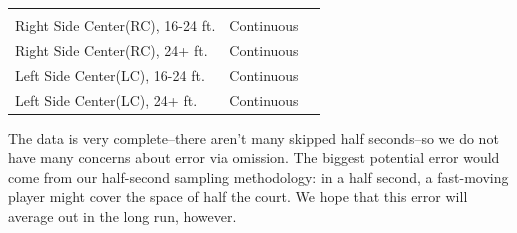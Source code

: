 \documentclass[]{article}
\begin{document}
\begin{longtable}[]{@{}lll@{}}
\begin{minipage}[t]{0.46\columnwidth}
\strut
\end{minipage}\tabularnewline
\begin{minipage}[t]{0.32\columnwidth}\raggedright\strut
Right Side Center(RC), 16-24 ft.\strut
\end{minipage} & \begin{minipage}[t]{0.13\columnwidth}\raggedright\strut
Continuous\strut
\end{minipage} & \begin{minipage}[t]{0.46\columnwidth}\raggedright\strut
\strut
\end{minipage}\tabularnewline
\begin{minipage}[t]{0.32\columnwidth}\raggedright\strut
Right Side Center(RC), 24+ ft.\strut
\end{minipage} & \begin{minipage}[t]{0.13\columnwidth}\raggedright\strut
Continuous\strut
\end{minipage} & \begin{minipage}[t]{0.46\columnwidth}\raggedright\strut
\strut
\end{minipage}\tabularnewline
\begin{minipage}[t]{0.32\columnwidth}\raggedright\strut
Left Side Center(LC), 16-24 ft.\strut
\end{minipage} & \begin{minipage}[t]{0.13\columnwidth}\raggedright\strut
Continuous\strut
\end{minipage} & \begin{minipage}[t]{0.46\columnwidth}\raggedright\strut
\strut
\end{minipage}\tabularnewline
\begin{minipage}[t]{0.32\columnwidth}\raggedright\strut
Left Side Center(LC), 24+ ft.\strut
\end{minipage} & \begin{minipage}[t]{0.13\columnwidth}\raggedright\strut
Continuous\strut
\end{minipage} & \begin{minipage}[t]{0.46\columnwidth}\raggedright\strut
\strut
\end{minipage}\tabularnewline
\bottomrule
\end{longtable}

The data is very complete--there aren't many skipped half seconds--so we
do not have many concerns about error via omission. The biggest
potential error would come from our half-second sampling methodology: in
a half second, a fast-moving player might cover the space of half the
court. We hope that this error will average out in the long run,
however.
\end{document}

